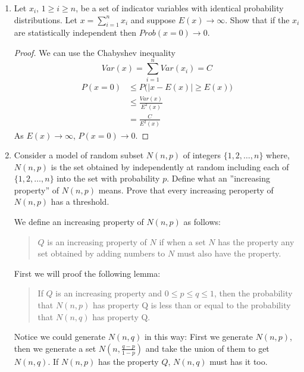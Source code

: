 \documentclass[a4paper, 12pt]{mcshw}
\begin{document}
\begin{enumerate}
    \item Let $x_i$, $1 \geq i \geq n$, be a set of indicator variables with identical probability distributions. Let $x = \sum_{i = 1}^{n}x_i$ and suppose $E(x) \to \infty$. Show that if the $x_i$ are statistically independent then $Prob(x = 0) \to 0$.
        \begin{proof}
            We can use the Chabyshev inequality
            $$Var(x) = \sum_{i = 1}^{n}Var(x_i) = C$$
            \begin{align*}
                P(x = 0) &\leq P\bigl(|x - E(x)| \geq E(x)\bigr)\\
                &\leq \frac{Var(x)}{E^2(x)}\\
                &= \frac{C}{E^2(x)}
            \end{align*}
            As $E(x) \to \infty$, $P(x = 0) \to 0$.

        \end{proof}
    \item Consider a model of random subset $N(n, p)$ of integers $\{1, 2, \dots, n\}$ where, $N(n, p)$ is the set obtained by independently at random including each of $\{1, 2, \dots, n\}$ into the set with probability $p$. Define what an ''increasing property'' of $N(n, p)$ means. Prove that every increasing peroperty of $N(n, p)$ has a threshold.
        \begin{solution}
            We define an increasing property of $N(n, p)$ as follows: 
            \begin{quote}
                $Q$ is an increasing property of $N$ if when a set $N$ has the property any set obtained by adding numbers to $N$ must also have the property.
            \end{quote}
            First we will proof the following lemma: 
            \begin{quote}
                If $Q$ is an increasing property and $0 \leq p \leq q \leq 1$, then the probability that $N(n, p)$ has property Q is less than or equal to the probability that $N(n, q)$ has property Q.
            \end{quote}
            Notice we could generate $N(n, q)$ in this way: First we generate $N(n, p)$, then we generate a set $N(n, \frac{q - p}{1 - p})$ and take the union of them to get $N(n, q)$. If $N(n, p)$ has the property $Q$, $N(n, q)$ must has it too. 


\end{solution}
\end{enumerate}
\end{document}
